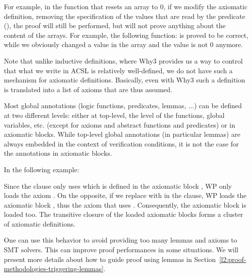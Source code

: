 For example, in the function that resets an array to 0, if we modify the
axiomatic definition, removing the specification of the values that are
read by the predicate (), the proof
will still be performed, but will not prove anything about the content
of the arrays. For example, the following function:
is proved to be correct, while we obviously changed a value in the array
and the value is not 0 anymore.



Note that unlike inductive definitions, where Why3 provides us a way to control
that what we write in ACSL is relatively well-defined, we do not have such a
mechanism for axiomatic definitions. Basically, even with Why3 such a definition
is translated into a list of axioms that are thus assumed.




Most global annotations (logic functions, predicates, lemmas, ...) can be
defined at two different levels: either at top-level, the level of the
functions, global variables, etc. (except for axioms and abstract functions and
predicates) or in axiomatic blocks. While top-level global annotations (in
particular lemmas) are always embedded in the context of verification
conditions, it is not the case for the annotations in axiomatic blocks.


In the following example:




Since the  clause only uses  which is defined
in the axiomatic block , WP only loads the axiom .
On the opposite, if we replace  with  in the
 clause, WP loads the axiomatic block , thus
the axiom  that uses . Consequently, the axiomatic
block  is loaded too. The transitive closure of the loaded
axiomatic blocks forms a cluster of axiomatic definitions.


One can use this behavior to avoid providing too many lemmas and axioms to SMT
solvers. This can improve proof performances in some situations. We will present
more details about how to guide proof using lemmas in
Section~\ref{l2:proof-methodologies-triggering-lemmas}.





